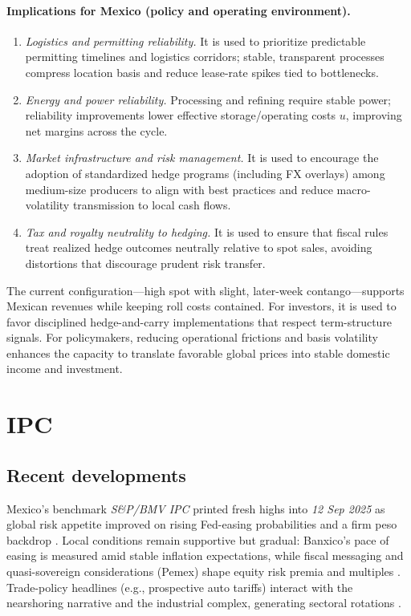 \documentclass[11pt,a4paper]{article} %
\let\oldsection\section
\renewcommand{\section}{%
    \clearpage
    \thispagestyle{myfancy}%
    \oldsection
  }
\begin{document}
\paragraph{Implications for Mexico (policy and operating environment).}
\begin{enumerate}
  \item \textit{Logistics and permitting reliability.} It is used to prioritize predictable permitting timelines and logistics corridors; stable, transparent processes compress location basis and reduce lease-rate spikes tied to bottlenecks.
  \item \textit{Energy and power reliability.} Processing and refining require stable power; reliability improvements lower effective storage/operating costs \(u\), improving net margins across the cycle.
  \item \textit{Market infrastructure and risk management.} It is used to encourage the adoption of standardized hedge programs (including FX overlays) among medium-size producers to align with best practices and reduce macro-volatility transmission to local cash flows.
  \item \textit{Tax and royalty neutrality to hedging.} It is used to ensure that fiscal rules treat realized hedge outcomes neutrally relative to spot sales, avoiding distortions that discourage prudent risk transfer.
\end{enumerate}

\medskip
The current configuration—high spot with slight, later-week contango—supports Mexican revenues while keeping roll costs contained. For investors, it is used to favor disciplined hedge-and-carry implementations that respect term-structure signals. For policymakers, reducing operational frictions and basis volatility enhances the capacity to translate favorable global prices into stable domestic income and investment.



\section{IPC}

\subsection{Recent developments}
Mexico's benchmark \emph{S\&P/BMV IPC} printed fresh highs into \emph{12 Sep 2025} as global risk appetite improved on rising Fed-easing probabilities and a firm peso backdrop \citep{reuters_ipc_record_2025,reuters_usdmxn_quote}. Local conditions remain supportive but gradual: Banxico's pace of easing is measured amid stable inflation expectations, while fiscal messaging and quasi-sovereign considerations (Pemex) shape equity risk premia and multiples \citep{bloomberg_mx_inflation_2025,mnd_inflation_band_2025,reuters_budget_2025,reuters_pemex_plan_2025}. Trade-policy headlines (e.g., prospective auto tariffs) interact with the nearshoring narrative and the industrial complex, generating sectoral rotations \citep{reuters_tariffs_china_autos_2025,reuters_border_jobs_2025}.
\end{document}
